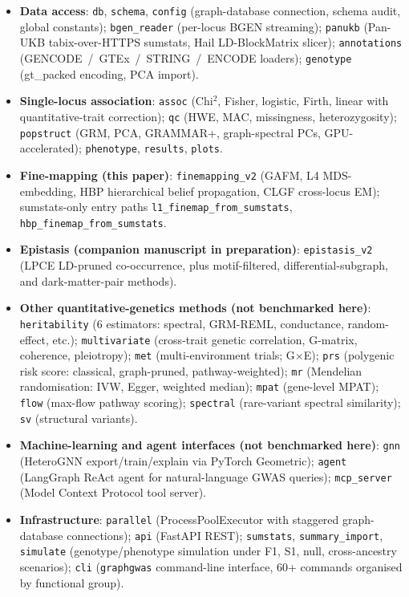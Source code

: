 \begin{itemize}
\item \textbf{Data access}: \texttt{db}, \texttt{schema}, \texttt{config}
      (graph-database connection, schema audit, global constants);
      \texttt{bgen\_reader} (per-locus BGEN streaming);
      \texttt{panukb} (Pan-UKB tabix-over-HTTPS sumstats,
      Hail LD-BlockMatrix slicer);
      \texttt{annotations} (GENCODE~/~GTEx~/~STRING~/~ENCODE
      loaders);
      \texttt{genotype} (gt\_packed encoding, PCA import).
\item \textbf{Single-locus association}: \texttt{assoc}
      (Chi$^2$, Fisher, logistic, Firth, linear with
      quantitative-trait correction); \texttt{qc} (HWE, MAC,
      missingness, heterozygosity); \texttt{popstruct} (GRM, PCA,
      GRAMMAR+, graph-spectral PCs, GPU-accelerated);
      \texttt{phenotype}, \texttt{results}, \texttt{plots}.
\item \textbf{Fine-mapping (this paper)}:
      \texttt{finemapping\_v2}
      (GAFM,
      L4 MDS-embedding, HBP hierarchical belief propagation,
      CLGF cross-locus EM); sumstats-only entry paths
      \texttt{l1\_finemap\_from\_sumstats},
      \texttt{hbp\_finemap\_from\_sumstats}.
\item \textbf{Epistasis (companion manuscript in preparation)}:
      \texttt{epistasis\_v2}
      (LPCE LD-pruned co-occurrence, plus motif-filtered,
      differential-subgraph, and dark-matter-pair methods).
\item \textbf{Other quantitative-genetics methods (not benchmarked here)}:
      \texttt{heritability} (6 estimators: spectral, GRM-REML,
      conductance, random-effect, etc.);
      \texttt{multivariate} (cross-trait genetic correlation,
      G-matrix, coherence, pleiotropy);
      \texttt{met} (multi-environment trials; G$\times$E);
      \texttt{prs} (polygenic risk score: classical,
      graph-pruned, pathway-weighted);
      \texttt{mr} (Mendelian randomisation: IVW, Egger, weighted
      median);
      \texttt{mpat} (gene-level MPAT); \texttt{flow} (max-flow
      pathway scoring); \texttt{spectral} (rare-variant spectral
      similarity); \texttt{sv} (structural variants).
\item \textbf{Machine-learning and agent interfaces (not benchmarked here)}:
      \texttt{gnn} (HeteroGNN export/train/explain via PyTorch
      Geometric); \texttt{agent} (LangGraph ReAct agent for
      natural-language GWAS queries); \texttt{mcp\_server} (Model
      Context Protocol tool server).
\item \textbf{Infrastructure}: \texttt{parallel} (ProcessPoolExecutor
      with staggered graph-database connections); \texttt{api} (FastAPI
      REST); \texttt{sumstats}, \texttt{summary\_import},
      \texttt{simulate} (genotype/phenotype simulation under F1,
      S1, null, cross-ancestry scenarios);
      \texttt{cli} (\texttt{graphgwas} command-line interface,
      60+ commands organised by functional group).
\end{itemize}

